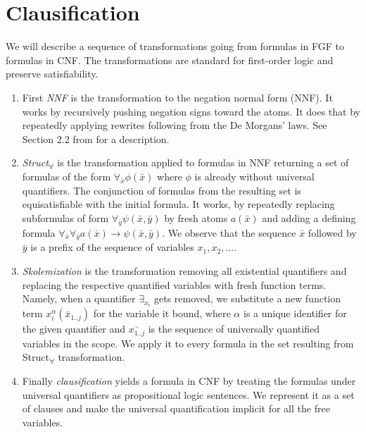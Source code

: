 \documentclass[english, shortabstract]{iithesis}
\theoremstyle{definition} \newtheorem{definition}{Definition}[chapter]
\theoremstyle{remark} \newtheorem{remark}[definition]{Observation}
\theoremstyle{plain} \newtheorem{theorem}[definition]{Theorem}
\theoremstyle{plain} \newtheorem{lemma}[definition]{Lemma}
\begin{document}
\section{Clausification}

We will describe a sequence of transformations going from formulas in FGF to formulas in CNF.
The transformations are standard for first-order logic and preserve satisfiability.
\begin{enumerate}
    \item First \emph{NNF} is the transformation to the negation normal form (NNF). 
    It works by recursively pushing negation signs toward the atoms.
    It does that by repeatedly applying rewrites following from the De Morgans' laws. 
    See Section 2.2 from \cite{leitsch} for a description.
    \item \emph{Struct\textsubscript{{$\forall$}}} is the transformation applied to formulas in NNF returning a set of formulas of the form $\forall_{\bar{x}}\phi(\bar{x})$ where $\phi$ is already without universal quantifiers.
    The conjunction of formulas from the resulting set is equisatisfiable with the initial formula.
    It works, by repeatedly replacing subformulas of form $\forall_{\bar{y}} \psi(\bar{x},\bar{y})$ 
    by fresh atoms $a(\bar{x})$ and adding a defining formula $\forall_{\bar{x}} \forall_{\bar{y}} a(\bar{x}) \rightarrow \psi(\bar{x},\bar{y})$.
    We observe that the sequence $\bar{x}$ followed by $\bar{y}$ is a prefix of the sequence of variables $x_1,x_2,\dots$.
    \item \emph{Skolemization} is the transformation removing all existential quantifiers and replacing the respective quantified variables with fresh function terms.
    Namely, when a quantifier $\exists_{x_i}$ gets removed, we substitute a new function term $x_i^{\alpha}(\bar{x}_{1..j})$ for the variable it bound, 
    where $\alpha$ is a unique identifier for the given quantifier and $\bar{x_{1..j}}$ is the sequence of universally quantified variables in the scope.
    We apply it to every formula in the set resulting from Struct\textsubscript{{$\forall$}} transformation.
    \item Finally \emph{clausification} yields a formula in CNF by treating the formulas under universal quantifiers as propositional logic sentences.
    We represent it as a set of clauses and make the universal quantification implicit for all the free variables. 
\end{enumerate}
\end{document}
